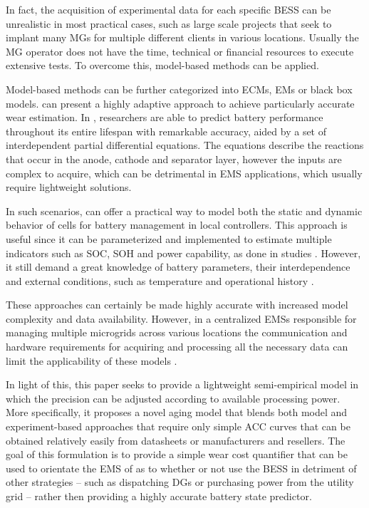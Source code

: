 \documentclass{ieeeaccess}
\begin{document}
    In fact, the acquisition of experimental data for each specific \ac{BESS} can be unrealistic in most practical cases, such as large scale projects that seek to implant many \acp{MG} for multiple different clients in various locations. Usually the \ac{MG} operator does not have the time, technical or financial resources to execute extensive tests. To overcome this, model-based methods can be applied.

    Model-based methods can be further categorized into \acp{ECM}, \acp{EM} or black box models.  can present a highly adaptive approach to achieve particularly accurate wear estimation. In \cite{XIONG2018264}, researchers are able to predict battery performance throughout its entire lifespan with remarkable accuracy, aided by a set of interdependent partial differential equations. The equations describe the reactions that occur in the anode, cathode and separator layer, however the inputs are complex to acquire, which can be detrimental in \ac{EMS} applications, which usually require lightweight solutions.

    In such scenarios,  can offer a practical way to model both the static and dynamic behavior of cells for battery management in local controllers. This approach is useful since it can be parameterized and implemented to estimate multiple indicators such as \ac{SOC}, \ac{SOH} and power capability, as done in studies \cite{verbrugge2004adaptive, verbrugge2007adaptive}. However, it still demand a great knowledge of battery parameters, their interdependence and external conditions, such as temperature and operational history \cite{zhang2018online}.

    These approaches can certainly be made highly accurate with increased model complexity and data availability. However, in a centralized \acp{EMS} responsible for managing multiple microgrids across various locations the communication and hardware requirements for acquiring and processing all the necessary data can limit the applicability of these models \cite{DIMEASHATZIARGYRIOU2005}.

    In light of this, this paper seeks to provide a lightweight semi-empirical model in which the precision can be adjusted according to available processing power. More specifically, it proposes a novel aging model that blends both model and experiment-based approaches that require only simple \ac{ACC} curves that can be obtained relatively easily from datasheets or manufacturers and resellers. The goal of this formulation is to provide a simple wear cost quantifier that can be used to orientate the \ac{EMS} of  as to whether or not use the \ac{BESS} in detriment of other strategies -- such as dispatching \ac{DG}s or purchasing power from the utility grid -- rather then providing a highly accurate battery state predictor.
\end{document}
